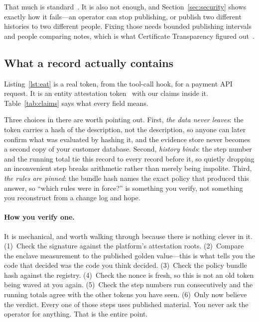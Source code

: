 \documentclass[11pt]{article}
\begin{document}
That much is standard~\cite{merkle1987,crosby2009}. It is also not enough, and
Section~\ref{sec:security} shows exactly how it fails---an operator can stop
publishing, or publish two different histories to two different people. Fixing
those needs bounded publishing intervals and people comparing notes, which is
what Certificate Transparency figured out~\cite{rfc6962,ctgossip,chase2016}.

\subsection{What a record actually contains}
\label{sec:schema}

Listing~\ref{lst:eat} is a real token, from the tool-call hook, for a payment
API request. It is an entity attestation token~\cite{rfc9711} with our claims
inside it. Table~\ref{tab:claims} says what every field means.

Three choices in there are worth pointing out. First, \emph{the data never
leaves}: the token carries a hash of the description, not the description, so
anyone can later confirm what was evaluated by hashing it, and the evidence
store never becomes a second copy of your customer database. Second,
\emph{history binds}: the step number and the running total tie this
record to every record before it, so quietly dropping an inconvenient step
breaks arithmetic rather than merely being impolite. Third, \emph{the rules are
pinned}: the bundle hash names the exact policy that produced this answer, so
``which rules were in force?'' is something you verify, not something you
reconstruct from a change log and hope.

\paragraph{How you verify one.} It is mechanical, and worth walking through
because there is nothing clever in it. (1)~Check the signature against the
platform's attestation roots. (2)~Compare the enclave measurement to the
published golden value---this is what tells you the code that decided was the
code you think decided. (3)~Check the policy bundle hash against the registry.
(4)~Check the nonce is fresh, so this is not an old token being waved at you
again. (5)~Check the step numbers run consecutively and the running totals
agree with the other tokens you have seen. (6)~Only now believe the verdict.
Every one of those steps uses published material. You never ask the operator
for anything. That is the entire point.
\end{document}
